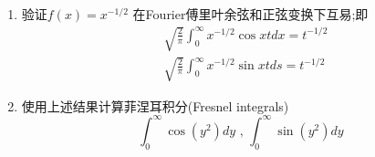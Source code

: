 \documentclass[10pt]{article}
\newenvironment{problem}[2][]{\begin{trivlist}
\item[\hskip \labelsep {\bfseries #1}\hskip \labelsep {\bfseries #2}]}{\end{trivlist}}
\begin{document}
\begin{problem}{6.5}
  \begin{enumerate}
  \item 验证$f(x)=x^{-1 / 2}$ 在Fourier傅里叶余弦和正弦变换下互易;即
  $$
  \begin{aligned}
  & \sqrt{\frac{2}{\pi}} \int_0^{\infty} x^{-1 / 2} \cos x t d x=t^{-1 / 2} \\
  & \sqrt{\frac{2}{\pi}} \int_0^{\infty} x^{-1 / 2} \sin x t d s=t^{-1 / 2}
  \end{aligned}
  $$
  \item 使用上述结果计算菲涅耳积分(Fresnel integrals)
  $$
  \int_0^{\infty} \cos \left(y^2\right) d y \text { , } \int_0^{\infty} \sin \left(y^2\right) d y
  $$
\end{enumerate}

\end{problem}
\end{document}
